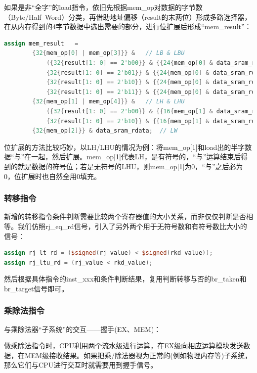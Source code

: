 \documentclass[11pt]{article}
\begin{document}
如果是非“全字”的load指令，依旧先根据mem_op对数据的字节数（Byte/Half\ Word）分类，再借助地址偏移（result的末两位）形成多路选择器，在从内存得到的4字节数据中选出需要的部分，进行位扩展后形成“mem_result”：

\begin{lstlisting}[language=Verilog, caption={load数据}]
assign mem_result   = 
        {32{mem_op[0] | mem_op[3]}} &   // LB & LBU
            ({32{result[1: 0] == 2'b00}} & {{24{mem_op[0] & data_sram_rdata[7]}}, data_sram_rdata[7: 0]} | 
    		{32{result[1: 0] == 2'b01}} & {{24{mem_op[0] & data_sram_rdata[15]}}, data_sram_rdata[15: 8]} | 
			{32{result[1: 0] == 2'b10}} & {{24{mem_op[0] & data_sram_rdata[23]}}, data_sram_rdata[23: 16]} | 
			{32{result[1: 0] == 2'b11}} & {{24{mem_op[0] & data_sram_rdata[31]}}, data_sram_rdata[31: 24]}) |
		{32{mem_op[1] | mem_op[4]}} &   // LH & LHU
			({32{result[1: 0] == 2'b00}} & {{16{mem_op[1] & data_sram_rdata[15]}}, data_sram_rdata[15: 0]} |
			{32{result[1: 0] == 2'b10}} & {{16{mem_op[1] & data_sram_rdata[31]}}, data_sram_rdata[31: 16]}) |
	 	{32{mem_op[2]}} & data_sram_rdata;  // LW
\end{lstlisting}

位扩展的方法比较巧妙，以LH/LHU的情况为例：将mem_op[1]和load出的半字数据“与”在一起，然后扩展。mem_op[1]代表LH，是有符号的，“与”运算结束后得到的就是数据的符号位；若是无符号的LHU，则mem_op[1]为0，“与”之后必为0，位扩展时也自然全用0填充。

\subsubsection{转移指令}
新增的转移指令条件判断需要比较两个寄存器值的大小关系，而非仅仅判断是否相等。我们仿照rj_eq_rd信号，引入了另外两个用于无符号数和有符号数比大小的信号：

\begin{lstlisting}[language=Verilog, caption={转移指令条件判断信号}]
assign rj_lt_rd = ($signed(rj_value) < $signed(rkd_value));
assign rj_ltu_rd = (rj_value < rkd_value);
\end{lstlisting}

然后根据具体指令的inst_xxx和条件判断结果，复用判断转移与否的br_taken和br_target信号即可。

\subsubsection{乘除法指令}
\noindent
与乘除法器“子系统”的交互——握手(EX、MEM)：

做乘除法指令时，CPU利用两个流水级进行运算，在EX级向相应运算模块发送数据，在MEM级接收结果。如果把乘/除法器视为正常的(例如物理内存等)子系统，那么它们与CPU进行交互时就需要用到握手信号。
\end{document}
